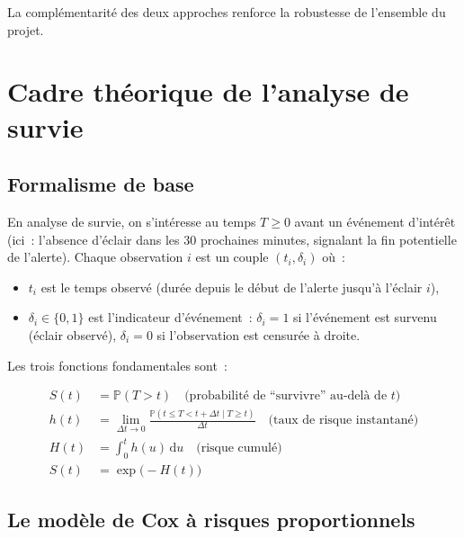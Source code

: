 \documentclass[a4paper,11pt]{article}
\newcommand{\Prob}{\mathbb{P}}
\newcommand{\Ssurvival}{S}
\begin{document}
La complémentarité des deux approches renforce la robustesse de l'ensemble du projet.

\section{Cadre théorique de l'analyse de survie}

\subsection{Formalisme de base}

En analyse de survie, on s'intéresse au temps $T \geq 0$ avant un événement d'intérêt
(ici~: l'absence d'éclair dans les 30 prochaines minutes, signalant la fin potentielle de l'alerte).
Chaque observation $i$ est un couple $(t_i, \delta_i)$ où~:

\begin{itemize}[leftmargin=1.8em]
  \item $t_i$ est le temps observé (durée depuis le début de l'alerte jusqu'à l'éclair $i$),
  \item $\delta_i \in \{0, 1\}$ est l'indicateur d'événement~: $\delta_i = 1$ si l'événement est
    survenu (éclair observé), $\delta_i = 0$ si l'observation est censurée à droite.
\end{itemize}

Les trois fonctions fondamentales sont~:

\begin{tcolorbox}[defstyle, title={Fonctions de survie, de risque et de risque cumulé}]
\begin{align}
  \Ssurvival(t) &= \Prob(T > t) \quad \text{(probabilité de ``survivre'' au-delà de }t\text{)} \\
  h(t) &= \lim_{\Delta t \to 0} \frac{\Prob(t \leq T < t+\Delta t \mid T \geq t)}{\Delta t}
         \quad \text{(taux de risque instantané)} \\
  H(t) &= \int_0^t h(u)\,\mathrm{d}u \quad \text{(risque cumulé)} \\
  \Ssurvival(t) &= \exp\bigl(-H(t)\bigr)
\end{align}
\end{tcolorbox}

\subsection{Le modèle de Cox à risques proportionnels}
\end{document}
